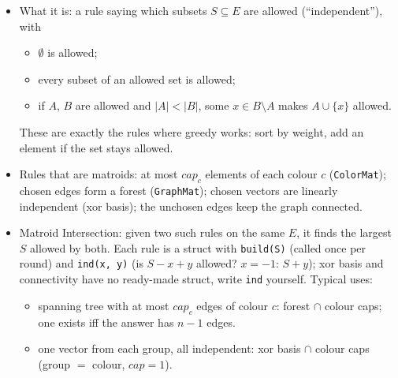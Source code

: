 \begin{itemize}
\item What it is: a rule saying which subsets $S \subseteq E$ are allowed (``independent''), with
\begin{itemize}
  \item $\emptyset$ is allowed;
  \item every subset of an allowed set is allowed;
  \item if $A$, $B$ are allowed and $|A| < |B|$, some $x \in B \setminus A$ makes $A \cup \{x\}$ allowed.
\end{itemize}
These are exactly the rules where greedy works: sort by weight, add an element if the set stays allowed.
\item Rules that are matroids: at most $cap_c$ elements of each colour $c$ (\texttt{ColorMat}); chosen edges form a forest (\texttt{GraphMat}); chosen vectors are linearly independent (xor basis); the unchosen edges keep the graph connected.
\item Matroid Intersection: given two such rules on the same $E$, it finds the largest $S$ allowed by both. Each rule is a struct with \texttt{build(S)} (called once per round) and \texttt{ind(x, y)} (is $S - x + y$ allowed? $x = -1$: $S + y$); xor basis and connectivity have no ready-made struct, write \texttt{ind} yourself. Typical uses:
\begin{itemize}
  \item spanning tree with at most $cap_c$ edges of colour $c$: forest $\cap$ colour caps; one exists iff the answer has $n - 1$ edges.
  \item one vector from each group, all independent: xor basis $\cap$ colour caps (group $=$ colour, $cap = 1$).
\end{itemize}
\end{itemize}
